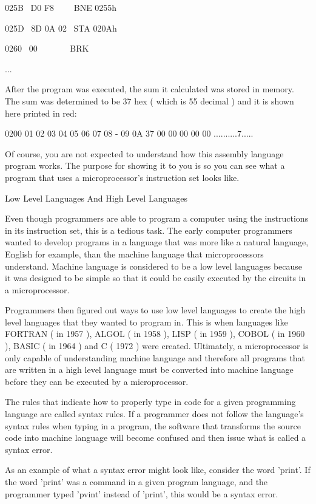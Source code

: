 \documentclass[12pt,oneside]{book}
\begin{document}
025B \ D0 F8 \ \ \ \ BNE 0255h

025D \ 8D 0A 02 \ STA 020Ah

0260 \ 00 \ \ \ \ \ \ \ BRK 

...


After the program was executed, the sum it calculated was stored in memory. The sum was determined to be 37 hex ( which is 55 decimal ) and it is shown here printed in red: 

0200 01 02 03 04 05 06 07 08 {}- 09 0A 37 00 00 00 00 00
..........7.....


Of course, you are not expected to understand how this assembly language program works. The purpose for showing it to you is so you can see what a program that uses a microprocessor's instruction set looks like. 

Low Level Languages And High Level Languages

Even though programmers are able to program a computer using the instructions in its instruction set, this is a tedious task. The early computer programmers wanted to develop programs in a language that was more like a natural language, English for example, than the machine language that microprocessors understand. Machine language is considered to be a low level languages because it was designed to be simple so that it could be easily executed by the circuits in a microprocessor. 

Programmers then figured out ways to use low level languages to create the high level languages that they wanted to program in. This is when languages like FORTRAN ( in 1957 ), ALGOL ( in 1958 ), LISP ( in 1959 ), COBOL ( in 1960 ), BASIC ( in 1964 ) and C ( 1972 ) were created. Ultimately, a microprocessor is only capable of understanding machine language and therefore all programs that are written in a high level language must be converted into machine language before they can be executed by a microprocessor. 

The rules that indicate how to properly type in code for a given programming language are called syntax rules. If a programmer does not follow the language's syntax rules when typing in a program, the software that transforms the source code into machine language will become confused and then issue what is called a syntax error. 

As an example of what a syntax error might look like, consider the word 'print'. If the word 'print' was a command in a given program language, and the programmer typed 'pvint' instead of 'print', this would be a syntax error.
\end{document}
